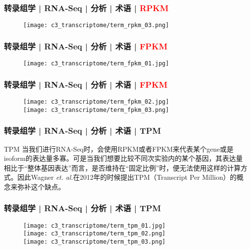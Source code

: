\begin{frame}
  \frametitle{转录组学 | RNA-Seq | 分析 | 术语 | \textcolor{red}{RPKM}}
  \begin{figure}
    \centering
    \texttt{[image: c3\_transcriptome/term\_rpkm\_03.png]}
  \end{figure}
\end{frame}

\begin{frame}
  \frametitle{转录组学 | RNA-Seq | 分析 | 术语 | \textcolor{red}{FPKM}}
  \begin{figure}
    \centering
    \texttt{[image: c3\_transcriptome/term\_fpkm\_01.jpg]}
  \end{figure}
\end{frame}

\begin{frame}
  \frametitle{转录组学 | RNA-Seq | 分析 | 术语 | \textcolor{red}{FPKM}}
  \begin{figure}
    \centering
    \texttt{[image: c3\_transcriptome/term\_fpkm\_02.jpg]}\\
    \vspace{1em}
    \texttt{[image: c3\_transcriptome/term\_fpkm\_03.png]}
  \end{figure}
\end{frame}

\begin{frame}
  \frametitle{转录组学 | RNA-Seq | 分析 | 术语 | TPM}
  \begin{block}{TPM}
    当我们进行RNA-Seq时，会使用RPKM或者FPKM来代表某个gene或是isoform的表达量多寡。可是当我们想要比较不同次实验内的某个基因，其表达量相比于“整体基因表达”而言，是否维持在“固定比例”时，便无法使用这样的计算方式。因此Wagner \textit{et. al.}在2012年的时候提出TPM（Transcript Per Million）的概念来弥补这个缺点。
  \end{block}
\end{frame}

\begin{frame}
  \frametitle{转录组学 | RNA-Seq | 分析 | 术语 | \alert{TPM}}
  \begin{figure}
    \centering
    \texttt{[image: c3\_transcriptome/term\_tpm\_01.jpg]}\\
    \texttt{[image: c3\_transcriptome/term\_tpm\_02.png]}\\
    \texttt{[image: c3\_transcriptome/term\_tpm\_03.png]}
  \end{figure}
\end{frame}

